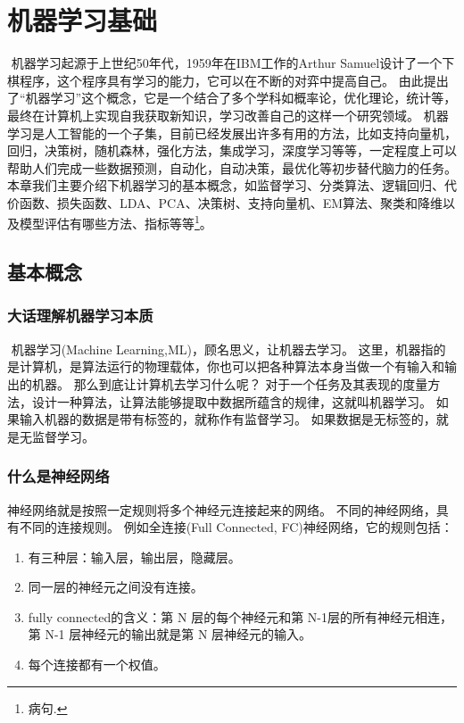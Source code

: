 \chapter{机器学习基础}
\label{ux7b2cux4e8cux7ae0-ux673aux5668ux5b66ux4e60ux57faux7840}
​ 机器学习起源于上世纪50年代，1959年在IBM工作的Arthur Samuel设计了一个下棋程序，这个程序具有学习的能力，它可以在不断的对弈中提高自己。
由此提出了``机器学习''这个概念，它是一个结合了多个学科如概率论，优化理论，统计等，最终在计算机上实现自我获取新知识，学习改善自己的这样一个研究领域。
机器学习是人工智能的一个子集，目前已经发展出许多有用的方法，比如支持向量机，回归，决策树，随机森林，强化方法，集成学习，深度学习等等，一定程度上可以帮助人们完成一些数据预测，自动化，自动决策，最优化等初步替代脑力的任务。
本章我们主要介绍下机器学习的基本概念，如监督学习、分类算法、逻辑回归、代价函数、损失函数、LDA、PCA、决策树、支持向量机、EM算法、聚类和降维以及模型评估有哪些方法、指标等等\footnote{病句.}。

\section{基本概念}
\label{ux57faux672cux6982ux5ff5}
\subsection{大话理解机器学习本质}
\label{ux5927ux8bddux7406ux89e3ux673aux5668ux5b66ux4e60ux672cux8d28}
​ 机器学习(Machine Learning,ML)，顾名思义，让机器去学习。
这里，机器指的是计算机，是算法运行的物理载体，你也可以把各种算法本身当做一个有输入和输出的机器。
那么到底让计算机去学习什么呢？
对于一个任务及其表现的度量方法，设计一种算法，让算法能够提取中数据所蕴含的规律，这就叫机器学习。
如果输入机器的数据是带有标签的，就称作有监督学习。
如果数据是无标签的，就是无监督学习。
\subsection{什么是神经网络}
\label{ux4ec0ux4e48ux662fux795eux7ecfux7f51ux7edc}
神经网络就是按照一定规则将多个神经元连接起来的网络。
不同的神经网络，具有不同的连接规则。
例如全连接(Full Connected, FC)神经网络，它的规则包括：
\begin{enumerate}
\item 有三种层：输入层，输出层，隐藏层。
\item 同一层的神经元之间没有连接。
\item fully connected的含义：第 N 层的每个神经元和第 N-1层的所有神经元相连，第 N-1 层神经元的输出就是第 N 层神经元的输入。
\item 每个连接都有一个权值。
\end{enumerate}
